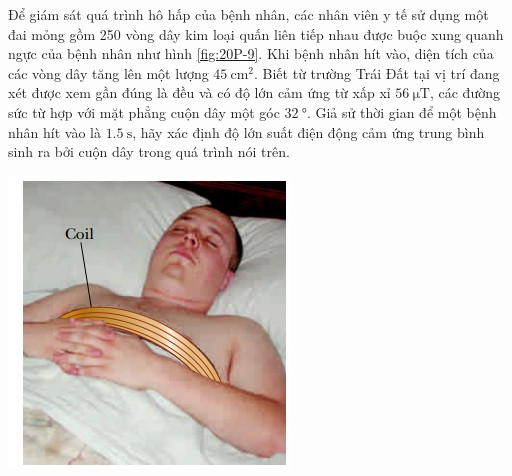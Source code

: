 \begin{ex}
	Để giám sát quá trình hô hấp của bệnh nhân, các nhân viên y tế sử dụng một đai mỏng gồm 250 vòng dây kim loại quấn liên tiếp nhau được buộc xung quanh ngực của bệnh nhân như hình \ref{fig:20P-9}. Khi bệnh nhân hít vào, diện tích của các vòng dây tăng lên một lượng $\SI{45}{\centi\meter^2}$. Biết từ trường Trái Đất tại vị trí đang xét được xem gần đúng là đều và có độ lớn cảm ứng từ xấp xỉ $\SI{56}{\micro\tesla}$, các đường sức từ hợp với mặt phẳng cuộn dây một góc $\SI{32}{\degree}$. Giả sử thời gian để một bệnh nhân hít vào là $\SI{1.5}{\second}$, hãy xác định độ lớn suất điện động cảm ứng trung bình sinh ra bởi cuộn dây trong quá trình nói trên.
	\begin{center}
		\includegraphics[width=0.4\linewidth]{figs/VN12-Y24-PH-SYL-020P-9}
		\label{fig:20P-9}
	\end{center}
	
\end{ex}

